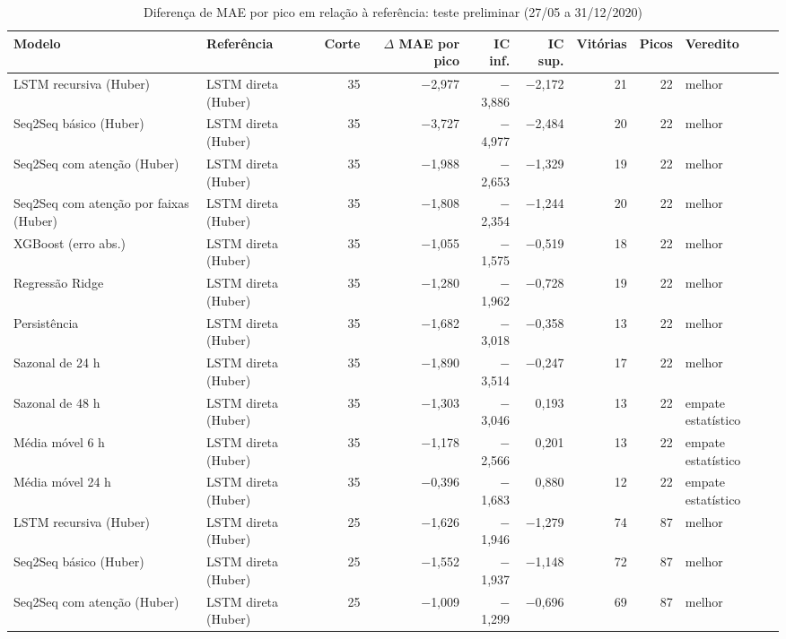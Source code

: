 \begin{table}[!htbp]
    \centering
    \caption{Diferença de MAE por pico em relação à referência: teste preliminar (27/05 a 31/12/2020)}
    \label{tab:eventos_pareado_teste_historico}
    \small
    \begin{adjustbox}{max width=\textwidth}
    \begin{tabular}{llrrrrrrl}
        \toprule
        Modelo & Referência & Corte & $\Delta$ MAE por pico & IC inf. & IC sup. & Vitórias & Picos & Veredito \\
        \midrule
        LSTM recursiva (Huber) & LSTM direta (Huber) & 35 & $-$2,977 & $-$3,886 & $-$2,172 & 21 & 22 & melhor \\
        Seq2Seq básico (Huber) & LSTM direta (Huber) & 35 & $-$3,727 & $-$4,977 & $-$2,484 & 20 & 22 & melhor \\
        Seq2Seq com atenção (Huber) & LSTM direta (Huber) & 35 & $-$1,988 & $-$2,653 & $-$1,329 & 19 & 22 & melhor \\
        Seq2Seq com atenção por faixas (Huber) & LSTM direta (Huber) & 35 & $-$1,808 & $-$2,354 & $-$1,244 & 20 & 22 & melhor \\
        XGBoost (erro abs.) & LSTM direta (Huber) & 35 & $-$1,055 & $-$1,575 & $-$0,519 & 18 & 22 & melhor \\
        Regressão Ridge & LSTM direta (Huber) & 35 & $-$1,280 & $-$1,962 & $-$0,728 & 19 & 22 & melhor \\
        \midrule
        Persistência & LSTM direta (Huber) & 35 & $-$1,682 & $-$3,018 & $-$0,358 & 13 & 22 & melhor \\
        Sazonal de 24 h & LSTM direta (Huber) & 35 & $-$1,890 & $-$3,514 & $-$0,247 & 17 & 22 & melhor \\
        Sazonal de 48 h & LSTM direta (Huber) & 35 & $-$1,303 & $-$3,046 & 0,193 & 13 & 22 & empate estatístico \\
        Média móvel 6 h & LSTM direta (Huber) & 35 & $-$1,178 & $-$2,566 & 0,201 & 13 & 22 & empate estatístico \\
        Média móvel 24 h & LSTM direta (Huber) & 35 & $-$0,396 & $-$1,683 & 0,880 & 12 & 22 & empate estatístico \\
        LSTM recursiva (Huber) & LSTM direta (Huber) & 25 & $-$1,626 & $-$1,946 & $-$1,279 & 74 & 87 & melhor \\
        Seq2Seq básico (Huber) & LSTM direta (Huber) & 25 & $-$1,552 & $-$1,937 & $-$1,148 & 72 & 87 & melhor \\
        Seq2Seq com atenção (Huber) & LSTM direta (Huber) & 25 & $-$1,009 & $-$1,299 & $-$0,696 & 69 & 87 & melhor \\

\end{tabular}
\end{adjustbox}
\end{table}
